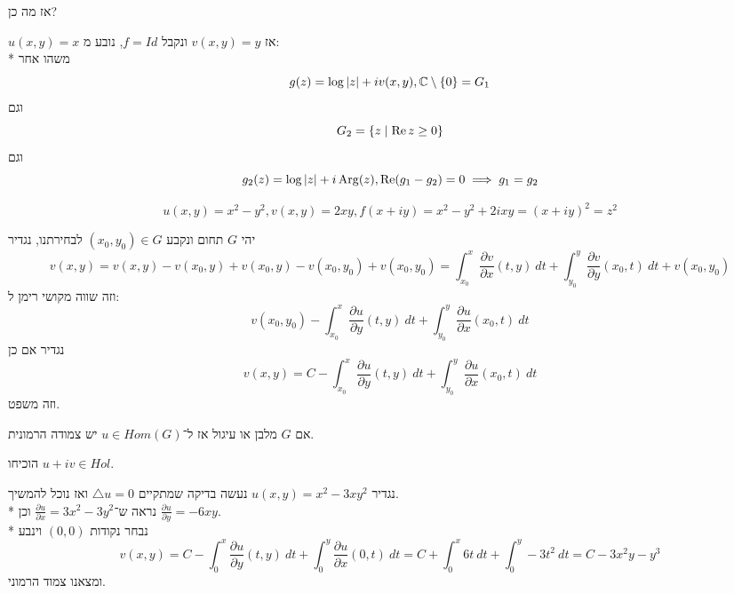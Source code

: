 אז מה כן?
\begin{example}
	$u(x, y) = x$ אז $v(x, y) = y$ ונקבל $f = Id$, נובע מ: \\*
	משהו אחר
	\[
		g(z) = \log|z| + i v(x, y), \mathbb{C} \setminus \{ 0 \} = G_1
	\]
	וגם
	\[
		G_2 = \{ z \mid \operatorname{Re} z \ge 0 \}
	\]
	וגם
	\[
		g_2(z) = \log|z| + i \operatorname{Arg}(z),
		\operatorname{Re}(g_1 - g_2) = 0 \implies g_1 = g_2
	\]
\end{example}
\begin{example}
	\[
		u(x, y) = x^2 - y^2, v(x, y) = 2xy,
		f(x + iy) = x^2 - y^2 + 2i xy = {(x + iy)}^2 = z^2
	\]
\end{example}
יהי $G$ תחום ונקבע $(x_0, y_0) \in G$ לבחירתנו, נגדיר
\[
	v(x, y) = v(x, y) - v(x_0, y) + v(x_0, y) - v(x_0, y_0) + v(x_0, y_0)
	= \int_{x_0}^{x}  \frac{\partial v}{\partial x}(t, y)\ dt + \int_{y_0}^{y} \frac{\partial v}{\partial y}(x_0, t)\ dt + v(x_0, y_0)
\]
וזה שווה מקושי רימן ל:
\[
	v(x_0, y_0) - \int_{x_0}^{x} \frac{\partial u}{\partial y}(t, y)\ dt + \int_{y_0}^{y} \frac{\partial u}{\partial x}(x_0, t)\ dt
\]
נגדיר אם כן
\[
	v(x, y) = C - \int_{x_0}^{x} \frac{\partial u}{\partial y}(t, y)\ dt + \int_{y_0}^{y} \frac{\partial u}{\partial x}(x_0, t)\ dt
\]
וזה משפט.
\begin{theorem}
	אם $G$ מלבן או עיגול אז ל־$u \in Hom(G)$ יש צמודה הרמונית.
\end{theorem}
\begin{exercise}
	הוכיחו $u + iv \in Hol$.
\end{exercise}
\begin{example}
	נגדיר $u(x, y) = x^2 - 3xy^2$
	נעשה בדיקה שמתקיים $\triangle u = 0$ ואז נוכל להמשיך. \\*
	נראה ש־$\frac{\partial u}{\partial x} = 3x^2 - 3y^2$ וכן $\frac{\partial u}{\partial y} = -6xy$. \\*
	נבחר נקודות $(0, 0)$ וינבע
	\[
		v(x, y) = C - \int_{0}^{x} \frac{\partial u}{\partial y}(t, y)\ dt + \int_{0}^{y} \frac{\partial u}{\partial x}(0, t)\ dt
		= C + \int_{0}^{x}  6t\ dt + \int_{0}^{y} -3t^2\ dt
		= C - 3x^2 y - y^3
	\]
	ומצאנו צמוד הרמוני.
\end{example}

